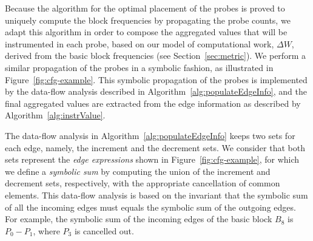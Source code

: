 \documentclass[sigplan,9pt]{acmart}
\begin{document}
Because the algorithm for the optimal placement of the probes is proved to
uniquely compute the block frequencies by propagating the probe counts,
we adapt this algorithm in order to compose the aggregated values that will
be instrumented in each probe, based on our model of computational work,
$\Delta W$, derived from the basic block frequencies (see Section~\ref{sec:metric}).
We perform a similar propagation of the probes in a symbolic fashion,
as illustrated in Figure~\ref{fig:cfg-example}.
This symbolic propagation of the probes is implemented by the data-flow analysis
described in Algorithm~\ref{alg:populateEdgeInfo}, and the final aggregated values
are extracted from the edge information as described by Algorithm~\ref{alg:instrValue}.

The data-flow analysis in Algorithm~\ref{alg:populateEdgeInfo} keeps two sets
for each edge, namely, the increment and the decrement sets.
We consider that both sets represent the \textit{edge expressions} shown in Figure~\ref{fig:cfg-example},
for which we define a \textit{symbolic sum} by computing the union of the increment
and decrement sets, respectively, with the appropriate cancellation of common elements.
This data-flow analysis is based on the invariant that the symbolic sum
of all the incoming edges must equals the symbolic sum of the outgoing
edges. For example, the symbolic sum of the incoming edges of the basic
block $B_8$ is $P_0 - P_1$, where $P_3$ is cancelled out.

\end{document}
